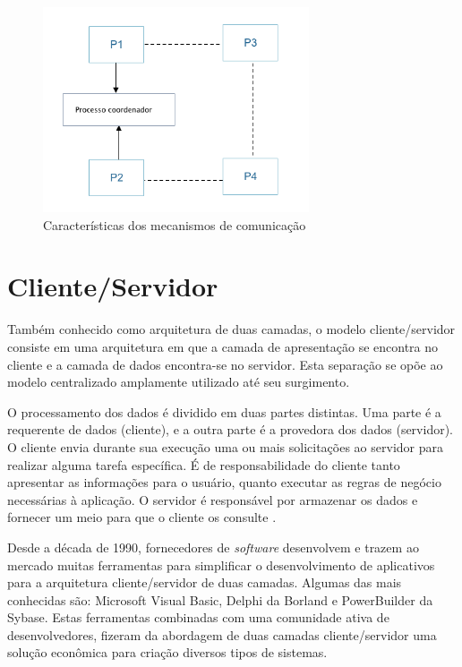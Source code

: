 \begin{figure}
    \centering
    \includegraphics[width=0.7\textwidth]{figuras/ipc.png}
    \caption{Características dos mecanismos de comunicação }
    \label{fig:how-communication-works}
\end{figure}

\section{Cliente/Servidor}\label{sec:clientserver}

Também conhecido como arquitetura de duas camadas, o modelo cliente/servidor consiste em uma arquitetura em que a camada de apresentação se encontra no cliente e a camada de dados encontra-se no servidor. Esta separação se opõe ao modelo centralizado amplamente utilizado até seu surgimento.

O processamento dos dados é dividido em duas partes distintas. Uma parte é a requerente de dados (cliente), e a outra parte é a provedora dos dados (servidor). O cliente envia durante sua execução uma ou mais solicitações ao servidor para realizar alguma tarefa específica. É de responsabilidade do cliente tanto apresentar as informações para o usuário, quanto executar as regras de negócio necessárias à aplicação. O servidor é responsável por armazenar os dados e fornecer um meio para que o cliente os consulte \cite{two-tier}.

Desde a década de 1990, fornecedores de \textit{software} desenvolvem e trazem ao mercado muitas ferramentas para simplificar o desenvolvimento de aplicativos para a arquitetura cliente/servidor de duas camadas. Algumas das mais conhecidas são: Microsoft Visual Basic, Delphi da Borland e PowerBuilder da Sybase. Estas ferramentas combinadas com uma comunidade ativa de desenvolvedores, fizeram da abordagem de duas camadas cliente/servidor uma solução econômica para criação diversos tipos de sistemas.

